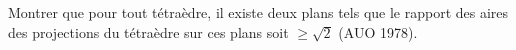 Montrer que pour tout tétraèdre, il existe deux plans tels que le rapport des aires des projections du tétraèdre sur ces plans soit $\geq \sqrt{2}$ (AUO 1978).

